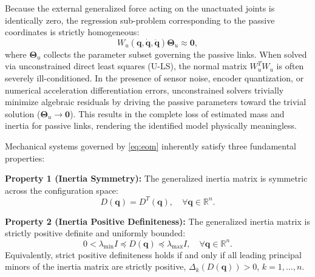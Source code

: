 \documentclass[lettersize,journal]{IEEEtran}
\begin{document}
Because the external generalized force acting on the unactuated joints is identically zero, the regression sub-problem corresponding to the passive coordinates is strictly homogeneous:
\begin{equation}
    W_u(\bm{q}, \dot{\bm{q}}, \ddot{\bm{q}}) \bm{\Theta}_u \approx \mathbf{0},
    \label{eq:nullspace_subsystem}
\end{equation}
where $\bm{\Theta}_u$ collects the parameter subset governing the passive links. When solved via unconstrained direct least squares (U-LS), the normal matrix $W_u^T W_u$ is often severely ill-conditioned. In the presence of sensor noise, encoder quantization, or numerical acceleration differentiation errors, unconstrained solvers trivially minimize algebraic residuals by driving the passive parameters toward the trivial solution ($\bm{\Theta}_u \to \mathbf{0}$). This results in the complete loss of estimated mass and inertia for passive links, rendering the identified model physically meaningless.

Mechanical systems governed by \eqref{eq:eom} inherently satisfy three fundamental properties:

\noindent\textbf{Property 1 (Inertia Symmetry):} The generalized inertia matrix is symmetric across the configuration space:
\begin{equation}
	D(\bm{q}) = D^T(\bm{q}), \quad \forall \bm{q} \in \mathbb{R}^n.
	\label{eq:prop_sym}
\end{equation}

\noindent\textbf{Property 2 (Inertia Positive Definiteness):} The generalized inertia matrix is strictly positive definite and uniformly bounded:
\begin{equation}
	0 < \lambda_{\min} I \preceq D(\bm{q}) \preceq \lambda_{\max} I, \quad \forall \bm{q} \in \mathbb{R}^n.
	\label{eq:prop_pd}
\end{equation}
Equivalently, strict positive definiteness holds if and only if all leading principal minors of the inertia matrix are strictly positive, $\Delta_k(D(\bm{q})) > 0$, $k = 1, \dots, n$.
\end{document}
